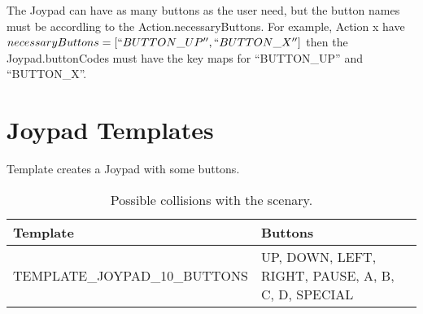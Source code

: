 	The Joypad can have as many buttons as the user need, but the button names must be accordling to the Action.necessaryButtons. For example, Action x have $necessaryButtons = [``BUTTON\_UP'', ``BUTTON\_X'']$ then the Joypad.buttonCodes must have the key maps for ``BUTTON\_UP'' and ``BUTTON\_X''.
	
	
	
	\section{Joypad Templates}
	Template creates a Joypad with some buttons.
	
	\begin{table}[H]
    \caption{Possible collisions with the scenary.}
    \label{tab:scenaryCollisionTypes}
    \centering
	
    \begin{tabular}{|l|p{5cm}|}
		\hline
		\textbf{Template} 				& \textbf{Buttons} \\
		\hline
		TEMPLATE\_JOYPAD\_10\_BUTTONS 	&  UP,  DOWN, LEFT,  RIGHT,  PAUSE,  A,  B,  C,  D, SPECIAL \\
		\hline
	\end{tabular}
	\end{table}
	
	